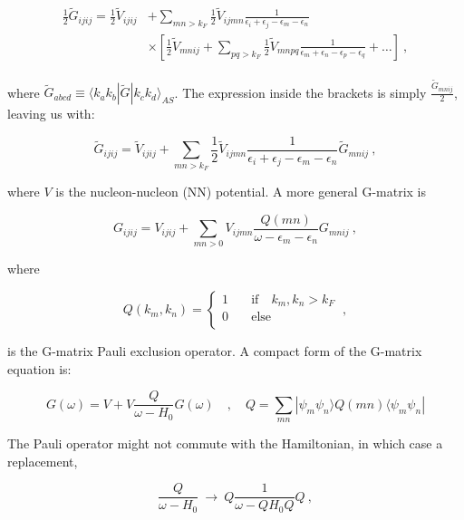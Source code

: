 \documentclass[10pt,twoside]{report}
\begin{document}
	\begin{align}
		\begin{split}
		\frac{1}{2}\tilde{G}_{ijij}= \frac{1}{2}\tilde{V}_{ijij} &+ \sum_{mn>k_F} \frac{1}{2}\tilde{V}_{ijmn}\frac{1}{\epsilon_i+\epsilon_j-\epsilon_m-\epsilon_n}\\
		&\times\left[ \frac{1}{2}\tilde{V}_{mnij} + \sum_{pq>k_F} \frac{1}{2}\tilde{V}_{mnpq}\frac{1}{\epsilon_m+\epsilon_n-\epsilon_p-\epsilon_q} + \ldots \right] \:,
		\end{split}
	\end{align}
	
	\noindent where $\tilde{G}_{abcd} \equiv \langle k_ak_b|\tilde{G}|k_ck_d\rangle_{AS}$. The expression inside the brackets is simply $\frac{\tilde{G}_{mnij}}{2}$, leaving us with:
	
	\begin{equation}
		\tilde{G}_{ijij}= \tilde{V}_{ijij} + \sum_{mn>k_F} \frac{1}{2}\tilde{V}_{ijmn}\frac{1}{\epsilon_i+\epsilon_j-\epsilon_m-\epsilon_n}\tilde{G}_{mnij}\:,
	\end{equation}
	
	\noindent where $V$ is the nucleon-nucleon (NN) potential. A more general G-matrix is
	
	\begin{equation}
		G_{ijij}= V_{ijij} + \sum_{mn>0} V_{ijmn}\frac{Q(mn)}{\omega-\epsilon_m-\epsilon_n}G_{mnij}\:,
	\end{equation}
	
	\noindent where
	
	\begin{equation}
	Q(k_m,k_n) =
		\begin{cases}
		1  & \quad \text{if} \quad k_m,k_n > k_F\\
		0  & \quad \text{else}\\
		\end{cases} \:,
	\end{equation}
	
	\noindent is the G-matrix Pauli exclusion operator. A compact form of the G-matrix equation is:
	
	\begin{equation}
		G(\omega) = V + V\frac{Q}{\omega - H_0}G(\omega) \quad,\quad Q = \sum_{mn} |\psi_m\psi_n\rangle Q(mn)\langle\psi_m\psi_n|
	\end{equation}
	
	The Pauli operator might not commute with the Hamiltonian, in which case a replacement,
	
	\begin{equation}
		\frac{Q}{\omega - H_0} \:\rightarrow\: Q\frac{1}{\omega - QH_0Q}Q \:,
	\end{equation}
	
\end{document}
